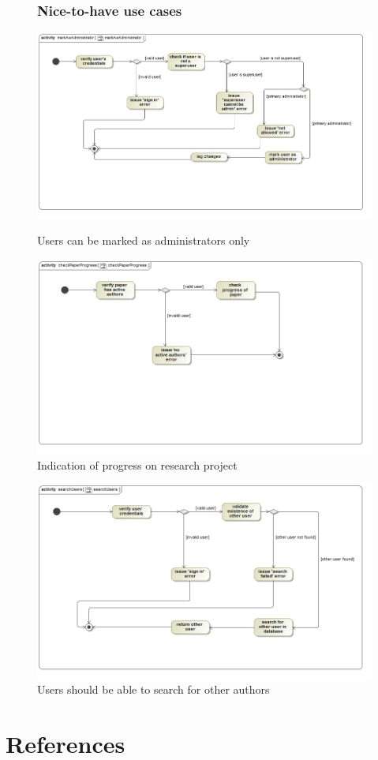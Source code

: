 \documentclass[a4paper,12pt]{report}
\begin{document}
\begin{figure}[ht]
\subsubsection{Nice-to-have use cases}
\includegraphics[scale=0.5]{act__markAsAdministrator__markAsAdministrator.jpg} 
\caption{Users can be marked as administrators only}


\includegraphics[scale=0.5]{act__checkPaperProgress__checkPaperProgress.jpg} 
\caption{Indication of progress on research project}

\end{figure}
\newpage
\begin{figure}[ht]

\includegraphics[scale=0.5]{act__searchUsers__searchUsers.jpg} 
\caption{Users should be able to search for other authors}


\end{figure}

\newpage


\section{References} 
\end{document}
